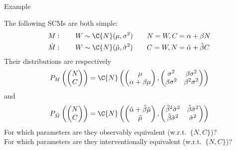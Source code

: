 \begin{frame}{Example}
\begin{Eg}
  The following SCMs are both simple:
  \begin{align*}
    M &: \qquad W \sim \C{N}(\mu,\sigma^2) \qquad N = W, C = \alpha + \beta N \\
    \tilde{M}&: \qquad W \sim \C{N}(\tilde{\mu},\tilde{\sigma}^2) \qquad C = W, N = \tilde{\alpha} + \tilde{\beta} C
  \end{align*}
Their distributions are respectively 
  $$P_M\left(\begin{pmatrix}N \\C\end{pmatrix}\right) = \C{N}\left(\begin{pmatrix} \mu \\ \alpha + \beta \mu \end{pmatrix}, \begin{pmatrix} \sigma^2 & \beta\sigma^2 \\ \beta\sigma^2 & \beta^2\sigma^2\end{pmatrix}\right)$$
and
  $$P_{\tilde{M}}\left(\begin{pmatrix}N\\C\end{pmatrix}\right) = \C{N}\left(\begin{pmatrix} \tilde{\alpha} + \tilde{\beta}\tilde{\mu} \\ \tilde{\mu} \end{pmatrix}, \begin{pmatrix} \tilde{\beta}^2\tilde{\sigma}^2 & \tilde{\beta}\tilde{\sigma}^2 \\ \tilde{\beta}\tilde{\sigma}^2 & \tilde{\sigma}^2\end{pmatrix}\right)$$
For which parameters are they observably equivalent (w.r.t.\ $\{N,C\}$)?\\
For which parameters are they interventionally equivalent (w.r.t.\ $\{N,C\}$)?
\end{Eg}
\end{frame}

